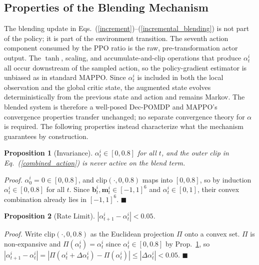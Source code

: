 \documentclass[a4paper,fleqn]{cas-dc}
\newtheorem{proposition}{Proposition}
\begin{document}
\subsection{Properties of the Blending Mechanism}
\label{blending_properties}
The blending update in Eqs.~(\ref{increment})--(\ref{incremental_blending}) is not part of the policy; it is part of the environment transition. The seventh action component consumed by the PPO ratio is the raw, pre-transformation actor output. The $\tanh$, scaling, and accumulate-and-clip operations that produce $\alpha_t^i$ all occur downstream of the sampled action, so the policy-gradient estimator is unbiased as in standard MAPPO. Since $\alpha_t^i$ is included in both the local observation and the global critic state, the augmented state evolves deterministically from the previous state and action and remains Markov. The blended system is therefore a well-posed Dec-POMDP and MAPPO's convergence properties transfer unchanged; no separate convergence theory for $\alpha$ is required. The following properties instead characterize what the mechanism guarantees by construction.

\begin{proposition}[Invariance]
\label{prop:invariance}
$\alpha_t^i \in [0, 0.8]$ for all $t$, and the outer clip in Eq.~(\ref{combined_action}) is never active on the blend term.
\end{proposition}
\textit{Proof.} $\alpha_0^i = 0 \in [0,0.8]$, and $\mathrm{clip}(\cdot, 0, 0.8)$ maps into $[0,0.8]$, so by induction $\alpha_t^i \in [0,0.8]$ for all $t$. Since $\mathbf{b}_t^i, \mathbf{m}_t^i \in [-1,1]^6$ and $\alpha_t^i \in [0,1]$, their convex combination already lies in $[-1,1]^6$. $\blacksquare$

\begin{proposition}[Rate Limit]
\label{prop:ratelimit}
$|\alpha_{t+1}^i - \alpha_t^i| < 0.05$.
\end{proposition}
\textit{Proof.} Write $\mathrm{clip}(\cdot,0,0.8)$ as the Euclidean projection $\Pi$ onto a convex set. $\Pi$ is non-expansive and $\Pi(\alpha_t^i) = \alpha_t^i$ since $\alpha_t^i \in [0,0.8]$ by Prop.~\ref{prop:invariance}, so $|\alpha_{t+1}^i - \alpha_t^i| = |\Pi(\alpha_t^i + \Delta\alpha_t^i) - \Pi(\alpha_t^i)| \le |\Delta\alpha_t^i| < 0.05$. $\blacksquare$
\end{document}
